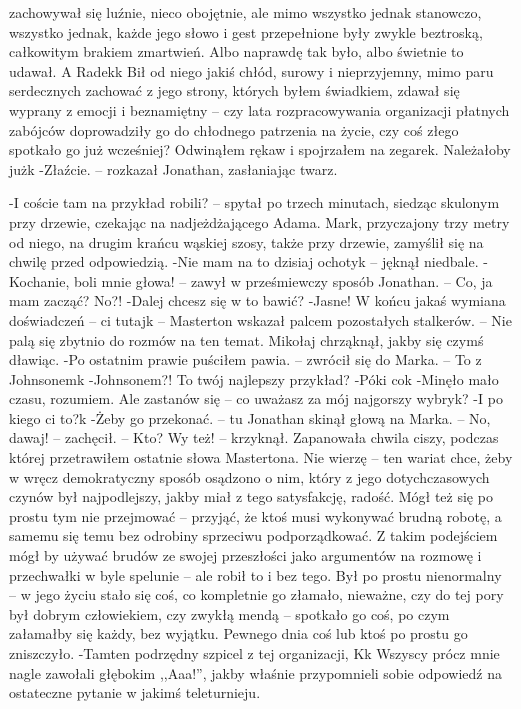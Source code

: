 \documentclass[../MAIN.tex]{subfiles}
\begin{document}
zachowywał się
luźnie,
nieco obojętnie, ale mimo wszystko jednak stanowczo, wszystko jednak, każde jego słowo i gest przepełnione były zwykle beztroską, całkowitym brakiem zmartwień. Albo naprawdę tak było, albo świetnie to udawał. A Radek\3k Bił od niego jakiś chłód, surowy i nieprzyjemny, mimo paru serdecznych zachować z jego strony, których byłem świadkiem, zdawał się wyprany z emocji i beznamiętny -- czy lata rozpracowywania organizacji płatnych zabójców doprowadziły go do chłodnego patrzenia na życie, czy coś złego spotkało go już wcześniej?
Odwinąłem rękaw i spojrzałem na zegarek. Należałoby już\3k
-Złaźcie. -- rozkazał Jonathan, zasłaniając twarz.

-I coście tam na przykład robili? -- spytał po trzech minutach, siedząc skulonym przy drzewie, czekając na nadjeżdżającego Adama. Mark, przyczajony trzy metry od niego, na drugim krańcu wąskiej szosy, także przy drzewie, zamyślił się na chwilę przed odpowiedzią.
-Nie mam na to dzisiaj ochoty\3k -- jęknął niedbale.
-Kochanie, boli mnie głowa! -- zawył w prześmiewczy sposób Jonathan. -- Co, ja mam zacząć? No?!
-Dalej chcesz się w to bawić?
-Jasne! W końcu jakaś wymiana doświadczeń -- ci tutaj\3k -- Masterton wskazał palcem pozostałych stalkerów. -- Nie palą się zbytnio do rozmów na ten temat.
Mikołaj chrząknął, jakby się czymś dławiąc.
-Po ostatnim prawie puściłem pawia. -- zwrócił się do Marka. -- To z Johnsonem\3k
-Johnsonem?! To twój najlepszy przykład?
-Póki co\3k
-Minęło mało czasu, rozumiem. Ale zastanów się -- co uważasz za mój najgorszy wybryk?
-I po kiego ci to?\3k
-Żeby go przekonać. -- tu Jonathan skinął głową na Marka. -- No, dawaj! -- zachęcił. -- Kto? Wy też! -- krzyknął.
Zapanowała chwila ciszy, podczas której przetrawiłem ostatnie słowa Mastertona. Nie wierzę -- ten wariat chce, żeby w wręcz demokratyczny sposób osądzono o nim, który z jego dotychczasowych czynów był najpodlejszy, jakby miał z tego satysfakcję, radość. Mógł też się po prostu tym nie przejmować -- przyjąć, że ktoś musi wykonywać brudną robotę, a samemu się temu bez odrobiny sprzeciwu podporządkować. Z takim podejściem mógł by używać brudów ze swojej przeszłości jako argumentów na rozmowę i przechwałki w byle spelunie -- ale robił to i bez tego. Był po prostu nienormalny -- w jego życiu stało się coś, co kompletnie go złamało, nieważne, czy do tej pory był dobrym człowiekiem, czy zwykłą mendą -- spotkało go coś, po czym załamałby się każdy, bez wyjątku. Pewnego dnia coś lub ktoś po prostu go zniszczyło.
-Tamten podrzędny szpicel z tej organizacji, K\3k
Wszyscy prócz mnie nagle zawołali głębokim ,,Aaa!'', jakby właśnie przypomnieli sobie odpowiedź na ostateczne pytanie w jakimś teleturnieju.
\end{document}

